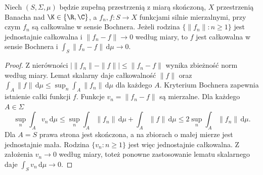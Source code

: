 \begin{wniosek}
\label{cor:bochner-vitali15b}
Niech $(S,\Sigma,\mu)$ będzie zupełną przestrzenią z miarą
skończoną, $X$ przestrzenią Banacha nad $\K\in\{\R,\C\}$,
a $f_n,f:S\to X$ funkcjami silnie mierzalnymi, przy czym
$f_n$ są całkowalne w sensie Bochnera.
Jeżeli rodzina $\{\|f_n\|:n\ge1\}$ jest jednostajnie
całkowalna i $\|f_n-f\|\to0$ według miary, to $f$ jest
całkowalna w sensie Bochnera i
$\int_S\|f_n-f\|\,\mathrm d\mu\to0$.
\end{wniosek}
\begin{proof}
Z nierówności $|\|f_n\|-\|f\||\le\|f_n-f\|$ wynika
zbieżność norm według miary. Lemat skalarny daje
całkowalność $\|f\|$ oraz
$\int_A\|f\|\,\mathrm d\mu\le\sup_n\int_A\|f_n\|\,\mathrm d\mu$
dla każdego $A$. Kryterium Bochnera zapewnia istnienie całki funkcji $f$.
Funkcje $v_n=\|f_n-f\|$ są mierzalne. Dla każdego $A\in\Sigma$
\[
 \sup_n\int_A v_n\,\mathrm d\mu
 \le\sup_n\int_A\|f_n\|\,\mathrm d\mu+\int_A\|f\|\,\mathrm d\mu
 \le2\sup_n\int_A\|f_n\|\,\mathrm d\mu.
\]
Dla $A=S$ prawa strona jest skończona, a na zbiorach
o małej mierze jest jednostajnie mała. Rodzina
$\{v_n:n\ge1\}$ jest więc jednostajnie całkowalna.
Z założenia $v_n\to0$ według miary, toteż ponowne
zastosowanie lematu skalarnego daje $\int_S v_n\,\mathrm d\mu\to0$.
\end{proof}

